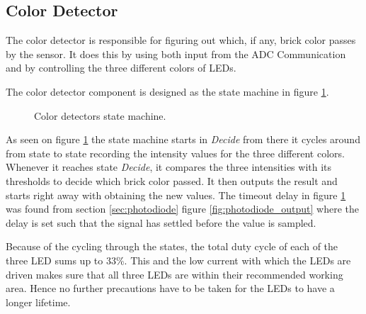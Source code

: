 
\subsection{Color Detector}
The color detector is responsible for figuring out which, if any, brick color passes by the sensor.
It does this by using both input from the ADC Communication and by controlling the three different colors of LEDs.

The color detector component is designed as the state machine in figure \ref{fig:colordetector_fsm}.



\begin{figure}[H]
\centering
{}

\caption{Color detectors state machine.}
\label{fig:colordetector_fsm}
\end{figure}

As seen on figure \ref{fig:colordetector_fsm} the state machine starts in \textit{Decide} from there it cycles around from state to state recording the intensity values for the three different colors.
Whenever it reaches state \textit{Decide}, it compares the three intensities with its thresholds to decide which brick color passed.
It then outputs the result and starts right away with obtaining the new values.
The timeout delay in figure \ref{fig:colordetector_fsm} was found from section \ref{sec:photodiode} figure \ref{fig:photodiode_output} where the delay is set such that the signal has settled before the value is sampled.

Because of the cycling through the states, the total duty cycle of each of the three LED sums up to 33\%.
This and the low current with which the LEDs are driven makes sure that all three LEDs are within their recommended working area.
Hence no further precautions have to be taken for the LEDs to have a longer lifetime.

